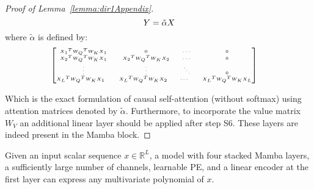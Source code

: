 \begin{proof}[Proof of Lemma~\ref{lemma:dir1Appendix}]
\begin{equation}\label{eq:MAMbaASmatmul1}
\small
Y = \tilde{\alpha} X%
\end{equation} 
where $\tilde{\alpha}$ is defined by:
\begin{equation}\label{eq:MAMbaASmatmul}\nonumber
\tiny
\hspace{-11pt}
\begin{bmatrix}
    {X_1}^T {W_Q}^T  W_K X_1 & 0 & \hspace{-2pt}\cdots & 0 \\
    {X_2}^T {W_Q}^T  W_K X_1 & {X_2}^T {W_Q}^T  W_K X_2 & \hspace{-2pt}\cdots & 0 \\
    \vdots & \vdots &\hspace{-2pt} \ddots & 0 \\
    {X_L}^T {W_Q}^T   W_K X_{1} \quad & {X_L}^T {W_Q}^T  W_K X_{2} \quad & \hspace{-2pt}\cdots \quad & {X_L}^T {W_Q}^T  W_K X_L
\end{bmatrix}
\end{equation}

Which is the exact formulation of causal self-attention (without softmax) using attention matrices denoted by $\tilde{\alpha}$. Furthermore, to incorporate the value matrix $W_V$ an additional linear layer should be applied after step S6. These layers are indeed present in the Mamba block.
%
\end{proof}
\setcounter{theorem}{1}
\begin{theorem}\label{theorem:AnyPolywithMambasAppendix}
Given an input scalar sequence $x \in \mathbb{R}^L $, a model with four stacked Mamba layers, a sufficiently large number of channels, learnable PE, and a linear encoder at the first layer can express any multivariate polynomial of $x$.
\end{theorem}

